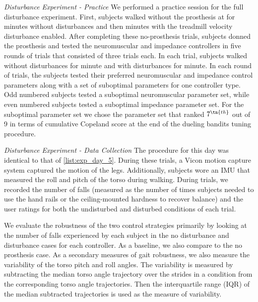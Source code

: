 \begin{days}
    \item\label{list:exp_day_5} \emph{Disturbance Experiment - Practice} We
    performed a practice session for the full disturbance experiment. First,
    subjects walked without the prosthesis at  for
    \unit[2]{minutes} without disturbances and then \unit[2]{minutes} with the
    treadmill velocity disturbance enabled. After completing these no-prosthesis
    trials, subjects donned the prosthesis and tested the neuromuscular and
    impedance controllers in five rounds of trials that consisted of three
    trials each. In each trial, subjects walked without disturbances for
    \unit[1]{minute} and with disturbances for \unit[1]{minute}. In each round
    of trials, the subjects tested their preferred neuromuscular and impedance
    control parameters along with a set of suboptimal parameters for one
    controller type. Odd numbered subjects tested a suboptimal neuromuscular
    parameter set, while even numbered subjects tested a suboptimal impedance
    parameter set. For the suboptimal parameter set we chose the parameter set
    that ranked $7^\tn{th}$ out of 9 in terms of cumulative Copeland score at
    the end of the dueling bandits tuning procedure.

    \item\label{list:exp_day_6} \emph{Disturbance Experiment - Data Collection}
    The procedure for this day was identical to that of \cref{list:exp_day_5}.
    During these trials, a Vicon motion capture system captured the motion of
    the legs. Additionally, subjects wore an IMU that measured the roll and
    pitch of the torso during walking. During trials, we recorded the number of
    falls (measured as the number of times subjects needed to use the hand rails
    or the ceiling-mounted hardness to recover balance) and the user ratings for
    both the undisturbed and disturbed conditions of each trial. 
\end{days}

We evaluate the robustness of the two control strategies primarily by looking at
the number of falls experienced by each subject in the no disturbance and
disturbance cases for each controller. As a baseline, we also compare to the no
prosthesis case. As a secondary measures of gait robustness, we also measure the
variability of the torso pitch and roll angles. The variability is measured by
subtracting the median torso angle trajectory over the strides in a condition
from the corresponding torso angle trajectories. Then the interquartile range
(IQR) of the median subtracted trajectories is used as the measure of
variability.
